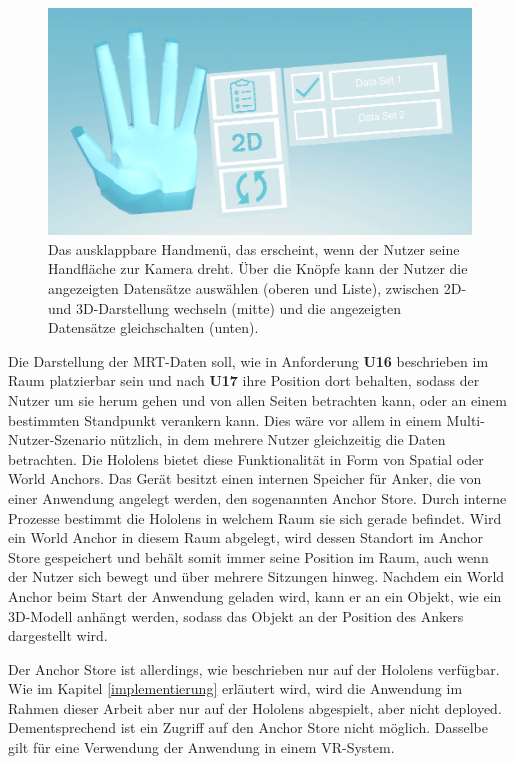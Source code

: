 \begin{figure}[!htb]
	\centering
	\includegraphics[width=0.7\linewidth]{images/handUI.png}
	\caption{Das ausklappbare Handmenü, das erscheint, wenn der Nutzer seine Handfläche zur Kamera dreht. Über die Knöpfe kann der Nutzer die angezeigten Datensätze auswählen (oberen und Liste), zwischen 2D- und 3D-Darstellung wechseln (mitte) und die angezeigten Datensätze gleichschalten (unten). }
	\label{img:handUI}
\end{figure}
\FloatBarrier


Die Darstellung der MRT-Daten soll, wie in Anforderung \textbf{U16} beschrieben im Raum platzierbar sein und nach \textbf{U17} ihre Position dort behalten, sodass der Nutzer um sie herum gehen und von allen Seiten betrachten kann, oder an einem bestimmten Standpunkt verankern kann. Dies wäre vor allem in einem Multi-Nutzer-Szenario nützlich, in dem mehrere Nutzer gleichzeitig die Daten betrachten.
Die Hololens bietet diese Funktionalität in Form von Spatial oder World Anchors. Das Gerät besitzt einen internen Speicher für Anker, die von einer Anwendung angelegt werden, den sogenannten Anchor Store. Durch interne Prozesse bestimmt die Hololens in welchem Raum sie sich gerade befindet. Wird ein World Anchor in diesem Raum abgelegt, wird dessen Standort im Anchor Store gespeichert und behält somit immer seine Position im Raum, auch wenn der Nutzer sich bewegt und über mehrere Sitzungen hinweg. Nachdem ein World Anchor beim Start der Anwendung geladen wird, kann er an ein Objekt, wie ein 3D-Modell anhängt werden, sodass das Objekt an der Position des Ankers dargestellt wird. 

Der Anchor Store ist allerdings, wie beschrieben nur auf der Hololens verfügbar. Wie im Kapitel \ref{implementierung} erläutert wird, wird die Anwendung im Rahmen dieser Arbeit aber nur auf der Hololens abgespielt, aber nicht deployed. Dementsprechend ist ein Zugriff auf den Anchor Store nicht möglich. Dasselbe gilt für eine Verwendung der Anwendung in einem VR-System.

